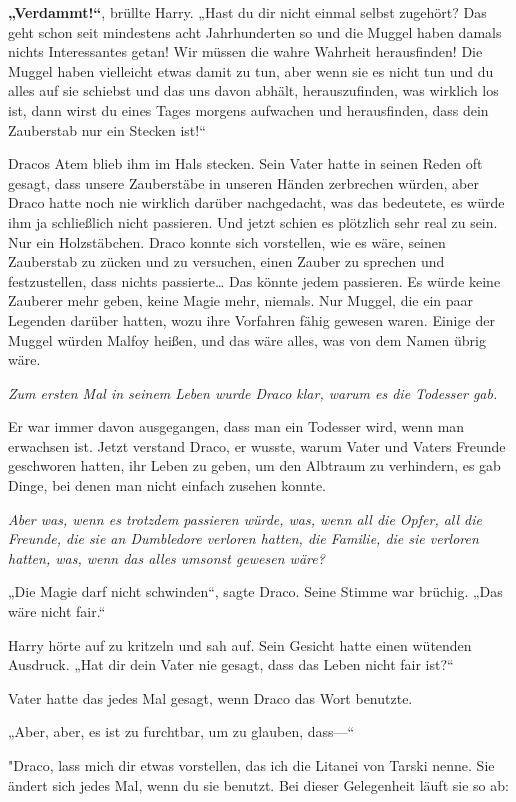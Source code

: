{\textbf{„Verdammt!“}, brüllte Harry. „Hast du dir nicht einmal selbst zugehört? Das geht schon seit mindestens acht Jahrhunderten so und die Muggel haben damals nichts Interessantes getan! Wir müssen die wahre Wahrheit herausfinden! Die Muggel haben vielleicht etwas damit zu tun, aber wenn sie es nicht tun und du alles auf sie schiebst und das uns davon abhält, herauszufinden, was wirklich los ist, dann wirst du eines Tages morgens aufwachen und herausfinden, dass dein Zauberstab nur ein Stecken ist!“

Dracos Atem blieb ihm im Hals stecken. Sein Vater hatte in seinen Reden oft gesagt, dass unsere Zauberstäbe in unseren Händen zerbrechen würden, aber Draco hatte noch nie wirklich darüber nachgedacht, was das bedeutete, es würde ihm ja schließlich nicht passieren. Und jetzt schien es plötzlich sehr real zu sein. Nur ein Holzstäbchen. Draco konnte sich vorstellen, wie es wäre, seinen Zauberstab zu zücken und zu versuchen, einen Zauber zu sprechen und festzustellen, dass nichts passierte… Das könnte jedem passieren. Es würde keine Zauberer mehr geben, keine Magie mehr, niemals. Nur Muggel, die ein paar Legenden darüber hatten, wozu ihre Vorfahren fähig gewesen waren. Einige der Muggel würden Malfoy heißen, und das wäre alles, was von dem Namen übrig wäre.

\emph{Zum ersten Mal in seinem Leben wurde Draco klar, warum es die Todesser gab.}

Er war immer davon ausgegangen, dass man ein Todesser wird, wenn man erwachsen ist. Jetzt verstand Draco, er wusste, warum Vater und Vaters Freunde geschworen hatten, ihr Leben zu geben, um den Albtraum zu verhindern, es gab Dinge, bei denen man nicht einfach zusehen konnte.

\emph{Aber was, wenn es trotzdem passieren würde, was, wenn all die Opfer, all die Freunde, die sie an Dumbledore verloren hatten, die Familie, die sie verloren hatten, was, wenn das alles umsonst gewesen wäre?}

„Die Magie darf nicht schwinden“, sagte Draco. Seine Stimme war brüchig. „Das wäre nicht fair.“

Harry hörte auf zu kritzeln und sah auf. Sein Gesicht hatte einen wütenden Ausdruck. „Hat dir dein Vater nie gesagt, dass das Leben nicht fair ist?“

Vater hatte das jedes Mal gesagt, wenn Draco das Wort benutzte.

„Aber, aber, es ist zu furchtbar, um zu glauben, dass—“

"Draco, lass mich dir etwas vorstellen, das ich die Litanei von Tarski nenne. Sie ändert sich jedes Mal, wenn du sie benutzt. Bei dieser Gelegenheit läuft sie so ab:

}

